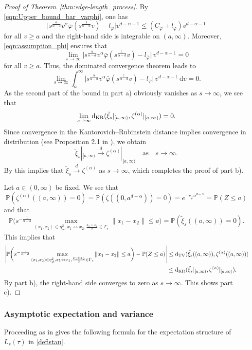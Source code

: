 \documentclass{article}
\theoremstyle{definition}
\numberwithin{equation}{section}
\theoremstyle{remark}
\begin{document}
\begin{proof}[Proof of Theorem~\ref{thm:edge-length_process}]
By \eqref{eqn:Upper_bound_bar_varphi}, one has
$$
\big|s^{\frac{\alpha}{\alpha-d}}v^{\alpha} \bar{\varphi}(s^{\frac{1}{\alpha-d}}v) -l_{\bar{\varphi}}\big| v^{d-\alpha-1} \leq (C_{\bar{\varphi}}+l_{\bar{\varphi}}) v^{d-\alpha-1}
$$
for all $v\geq a$ and the right-hand side is integrable on $(a,\infty)$. Moreover, \eqref{eqn:assumption_phi} ensures that
$$
\lim_{s\to\infty} \big|s^{\frac{\alpha}{\alpha-d}}v^{\alpha} \bar{\varphi}(s^{\frac{1}{\alpha-d}}v) -l_{\bar{\varphi}}\big| \, v^{d-\alpha-1} = 0
$$
for all $v\geq a$. Thus, the dominated convergence theorem leads to
$$
\lim_{s\to\infty} \int_a^\infty \big|s^{\frac{\alpha}{\alpha-d}}v^{\alpha} \bar{\varphi}(s^{\frac{1}{\alpha-d}}v) -l_{\bar{\varphi}}\big| \, v^{d-\alpha-1}\, \mathrm{d}v = 0.
$$
As the second part of the bound in part a) obviously vanishes as $s\to\infty$, we see that
$$
\lim_{s\to\infty} {\rm d}_{\rm KR}(\tilde{\xi}_s|_{[a,\infty)},\zeta^{(\alpha)}|_{[a,\infty)})=0.
$$
Since convergence in the Kantorovich--Rubinstein distance implies convergence in distribution (see Proposition 2.1 in \cite{dst}), we obtain
$$
\tilde{\xi}_s|_{[a,\infty)}\overset{d}{\longrightarrow}\zeta^{(\alpha)}|_{[a,\infty)} \quad \text{as} \quad s\to\infty.
$$
By \cite[Theorem 23.16]{Kallenberg_2023} this implies that $\tilde{\xi}_s\overset{d}{\longrightarrow}\zeta^{(\alpha)}$ as $s\to\infty$, which completes the proof of part b).

Let $a\in(0,\infty)$ be fixed. We see that
$$
\mathbb{P}(\zeta^{(\alpha)}((a,\infty))=0)= \mathbb{P}(\zeta((0,a^{d-\alpha}))=0) = e^{-c_{\bar{\varphi}} a^{d-\alpha}}=\mathbb{P}(Z\le a)
$$
and that
$$
\mathbb{P}\bigg( s^{-\frac{1}{\alpha-d}}\max_{(x_1,x_2)\in\eta_{\neq}^2, x_1\leftrightarrow x_2, \frac{x_1+x_2}{2}\in\Gamma_s} \|x_1-x_2\|\le a\bigg) = \mathbb{P}(\tilde{\xi}_s((a,\infty))=0).
$$
This implies that
\begin{align*}
\left| \mathbb{P}\bigg( s^{-\frac{1}{\alpha-d}}\max_{(x_1,x_2)\in\eta_{\neq}^2,x_1\leftrightarrow x_2, \frac{x_1+x_2}{2}\in\Gamma_s} \|x_1-x_2\|\le a\bigg) - \mathbb{P}(Z\le a) \right| & \leq {\rm d}_{\rm TV}(\tilde{\xi}_s((a,\infty)),\zeta^{(\alpha)}((a,\infty))) \\ & \leq {\rm d}_{\rm KR}(\tilde{\xi}_s|_{[a,\infty)},\zeta^{(\alpha)}|_{[a,\infty)}).
\end{align*}
By part b), the right-hand side converges to zero as $s\to\infty$. This shows part c). 
\end{proof}

\subsubsection{Asymptotic expectation and variance}
Proceeding as in \cite[Theorem 3.1]{reitznerschultethaele} gives the following formula for the expectation structure of $L_s(\tau)$ in \eqref{deflstau}. 
\end{document}
